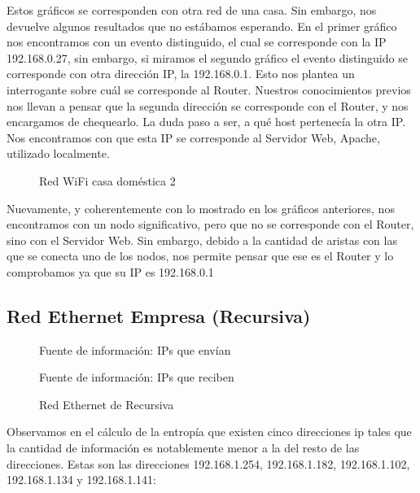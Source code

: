\documentclass[a4paper, 11pt]{article}
\newcommand{\ponerGrafico}[4]
{\begin{figure}[H]
  \centering
  \subfloat{\hspace{-3.5cm}\texttt{[image: \#1]}}
  \caption{#2} \label{fig:#4}
\end{figure}
}
\begin{document}
Estos gr\'aficos se corresponden con otra red de una casa. Sin embargo, nos devuelve algunos resultados que no est\'abamos esperando.
En el primer gr\'afico nos encontramos con un evento distinguido, el cual se corresponde con la IP  192.168.0.27, sin embargo, si miramos el segundo gr\'afico el evento distinguido se corresponde con otra direcci\'on IP, la 192.168.0.1. Esto nos plantea un interrogante sobre cu\'al se corresponde al Router. Nuestros conocimientos previos nos llevan a pensar que la segunda direcci\'on se corresponde con el Router, y nos encargamos de chequearlo. La duda paso a ser, a qu\'e host pertenec\'ia la otra IP. Nos encontramos con que esta IP se corresponde al Servidor Web, Apache, utilizado localmente.

\ponerGrafico{graficos/casa_santi_grafo.png}{Red WiFi casa dom\'estica 2}{0.5}{label}

Nuevamente, y coherentemente con lo mostrado en los gr\'aficos anteriores, nos encontramos con un nodo significativo, pero que no se corresponde con el Router, sino con el Servidor Web. Sin embargo, debido a la cantidad de aristas con las que se conecta uno de los nodos, nos permite pensar que ese es el Router y lo comprobamos ya que su IP es 192.168.0.1

\subsection{Red Ethernet Empresa (Recursiva)}
\ponerGrafico{graficos/recursiva_entropia.png}{Fuente de informaci\'on: IPs que env\'ian}{0.5}{label}
\ponerGrafico{graficos/recursiva_entropia_rcv.png}{Fuente de informaci\'on: IPs que reciben}{0.5}{label}
\ponerGrafico{graficos/recursiva_grafo.png}{Red Ethernet de Recursiva}{0.5}{label}

Observamos en el cálculo de la entropía que existen cinco direcciones ip tales que la cantidad de información es notablemente menor a la del resto de las direcciones. Estas son las direcciones 192.168.1.254, 192.168.1.182, 192.168.1.102, 192.168.1.134 y 192.168.1.141:
\end{document}
